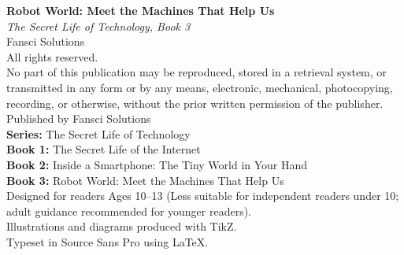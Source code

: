 
\thispagestyle{empty}
\vspace*{\fill}

\begin{flushleft}
  \textbf{Robot World: Meet the Machines That Help Us}\\
  \emph{The Secret Life of Technology, Book 3}\\
  \vspace{12pt}
  \textcopyright{} \the\year{} Fansci Solutions\\
  All rights reserved.\\
  \vspace{12pt}
  No part of this publication may be reproduced, stored in a retrieval system,
  or transmitted in any form or by any means, electronic, mechanical, photocopying,
  recording, or otherwise, without the prior written permission of the publisher.\\
  \vspace{12pt}
  Published by Fansci Solutions\\
  \vspace{12pt}
  \textbf{Series:} The Secret Life of Technology\\
  \textbf{Book 1:} The Secret Life of the Internet\\
  \textbf{Book 2:} Inside a Smartphone: The Tiny World in Your Hand\\
  \textbf{Book 3:} Robot World: Meet the Machines That Help Us\\
  \vspace{12pt}
  Designed for readers Ages 10--13 (Less suitable for independent readers under 10; adult guidance recommended for younger readers).\\
  \vspace{12pt}
  Illustrations and diagrams produced with TikZ.\\
  Typeset in Source Sans Pro using \LaTeX.\\
\end{flushleft}

\vspace*{\fill}
\clearpage
